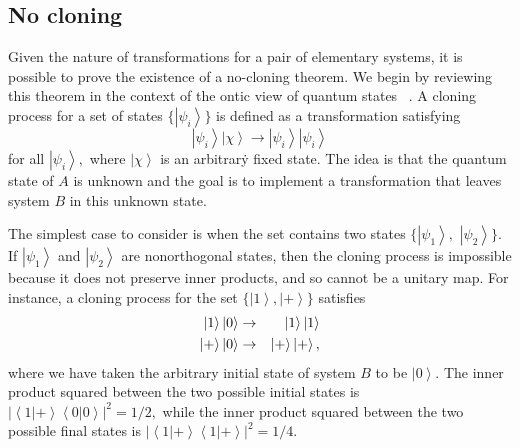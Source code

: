 \documentclass[pra,twocolumn,nofootinbib,showpacs]{revtex4}
\begin{document}
\subsection{No cloning}

\label{nocloning}

\strut Given the nature of transformations for a pair of
elementary systems, it is possible to prove the existence of a
no-cloning theorem. We begin by reviewing this theorem in the
context of the ontic view of quantum states~
\cite{WoottersZurek,Dieks}. A cloning process for a set of states
$\{\left| \psi _{i}\right\rangle \}$ is defined as a
transformation satisfying
\begin{equation}
\left| \psi _{i}\right\rangle \left| \chi \right\rangle \rightarrow \left|
\psi _{i}\right\rangle \left| \psi _{i}\right\rangle  \label{defncloning}
\end{equation}
for all $\left| \psi _{i}\right\rangle ,$ where $\left| \chi \right\rangle $
is an arbitrar\.{y} fixed state. The idea is that the quantum state of $A$
is unknown and the goal is to implement a transformation that leaves system $%
B$ in this unknown state.

The simplest case to consider is when the set contains two states $\{\left|
\psi _{1}\right\rangle ,$ $\left| \psi _{2}\right\rangle \}$. If $\left|
\psi _{1}\right\rangle $ and $\left| \psi _{2}\right\rangle $ are
nonorthogonal states, then the cloning process is impossible because it does
not preserve inner products, and so cannot be a unitary map. For instance, a
cloning process for the set $\{\left| 1\right\rangle ,\left| +\right\rangle
\}$ satisfies
\begin{eqnarray}
\left| 1\right\rangle \left| 0\right\rangle &\rightarrow &\left|
1\right\rangle \left| 1\right\rangle  \notag \\
\left| +\right\rangle \left| 0\right\rangle &\rightarrow &\left|
+\right\rangle \left| +\right\rangle ,
\end{eqnarray}
where we have taken the arbitrary initial state of system $B$ to be $\left|
0\right\rangle .$ The inner product squared between the two possible initial
states is $\left| \left\langle 1|+\right\rangle \left\langle
0|0\right\rangle \right| ^{2}=1/2,$ while the inner product squared between
the two possible final states is $\left| \left\langle 1|+\right\rangle
\left\langle 1|+\right\rangle \right| ^{2}=1/4.$
\end{document}
